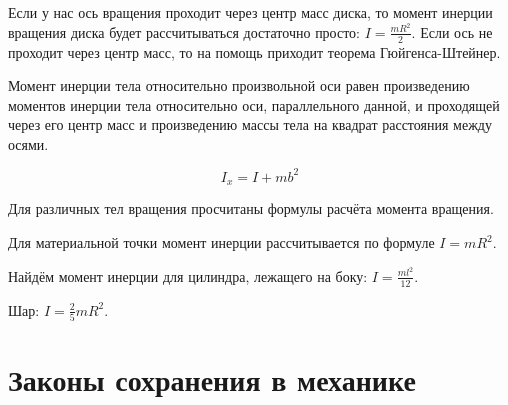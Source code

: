 \begin{figure}[!htpb]
  \begin{center}
  \end{center}
\end{figure}

Если у нас ось вращения проходит через центр масс диска, то момент инерции
вращения диска будет рассчитываться достаточно просто: \( I = \frac{m R^2}{2}
\). Если ось не проходит через центр масс, то на помощь приходит теорема
Гюйгенса-Штейнер.


\begin{theorem}\label{thrm:shteiner}
  Момент инерции тела относительно произвольной оси равен произведению моментов
  инерции тела относительно оси, параллельного данной, и проходящей через его
  центр масс и произведению массы тела на квадрат расстояния между осями.

  \begin{equation}
    I_x = I + m b^2
  \end{equation}
\end{theorem}

Для различных тел вращения просчитаны формулы расчёта момента вращения.

Для материальной точки момент инерции рассчитывается по формуле \( I
= m R^2  \).

Найдём момент инерции для цилиндра, лежащего на боку: \( I = \frac{m l^2
}{12} \).

Шар: \( I = \frac{2}{5} m R^2  \).

\section{Законы сохранения в механике}


